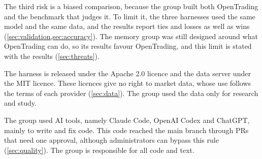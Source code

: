 The third risk is a biased comparison, because the group built both OpenTrading and the benchmark that judges it.
To limit it, the three harnesses used the same model and the same data, and the results report ties and losses as well as wins (\cref{sec:validation,sec:accuracy}).
The memory group was still designed around what OpenTrading can do, so its results favour OpenTrading, and this limit is stated with the results (\cref{sec:threats}).

The harness is released under the Apache 2.0 licence and the data server under the MIT licence.
These licences give no right to market data, whose use follows the terms of each provider (\cref{sec:data}).
The group used the data only for research and study.

The group used AI tools, namely Claude Code, OpenAI Codex and ChatGPT, mainly to write and fix code.
This code reached the main branch through PRs that need one approval, although administrators can bypass this rule (\cref{sec:quality}).
The group is responsible for all code and text.
